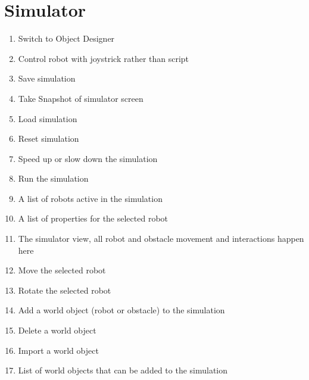 \documentclass[letterpaper,10pt,english]{sphinxmanual}
\let\sphinxpxdimen\pdfpxdimen\else\newdimen\sphinxpxdimen
\begin{document}
\section{Simulator}
\label{\detokenize{index:simulator}}
\begin{enumerate}
\item {} 
Switch to Object Designer

\item {} 
Control robot with joystrick rather than script

\item {} 
Save simulation

\item {} 
Take Snapshot of simulator screen

\item {} 
Load simulation

\item {} 
Reset simulation

\item {} 
Speed up or slow down the simulation

\item {} 
Run the simulation

\item {} 
A list of robots active in the simulation

\item {} 
A list of properties for the selected robot

\item {} 
The simulator view, all robot and obstacle movement and interactions happen here

\item {} 
Move the selected robot

\item {} 
Rotate the selected robot

\item {} 
Add a world object (robot or obstacle) to the simulation

\item {} 
Delete a world object

\item {} 
Import a world object

\item {} 
List of world objects that can be added to the simulation

\end{enumerate}
\end{document}
